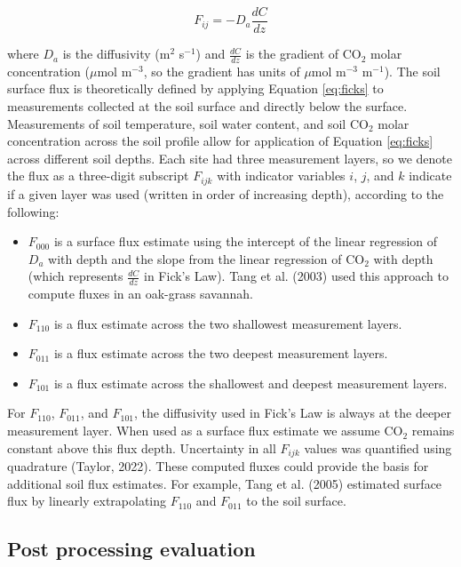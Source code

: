 \documentclass[
  letterpaper,
  DIV=11,
  numbers=noendperiod]{scrartcl}
\providecommand{\tightlist}{%
  \setlength{\itemsep}{0pt}\setlength{\parskip}{0pt}}\usepackage{longtable,booktabs,array}
\begin{document}
\begin{equation}
  F_{ij} = -D_{a} \frac{dC}{dz}
  \label{eq:ficks}
\end{equation}

where \(D_{a}\) is the diffusivity (m\(^{2}\) s\(^{-1}\)) and
\(\frac{dC}{dz}\) is the gradient of CO\(_{2}\) molar concentration
(\(\mu\)mol m\(^{-3}\), so the gradient has units of \(\mu\)mol
m\(^{-3}\) m\(^{-1}\)). The soil surface flux is theoretically defined
by applying Equation \ref{eq:ficks} to measurements collected at the
soil surface and directly below the surface. Measurements of soil
temperature, soil water content, and soil CO\(_{2}\) molar concentration
across the soil profile allow for application of Equation \ref{eq:ficks}
across different soil depths. Each site had three measurement layers, so
we denote the flux as a three-digit subscript \(F_{ijk}\) with indicator
variables \(i\), \(j\), and \(k\) indicate if a given layer was used
(written in order of increasing depth), according to the following:

\begin{itemize}
\tightlist
\item
  \(F_{000}\) is a surface flux estimate using the intercept of the
  linear regression of \(D_{a}\) with depth and the slope from the
  linear regression of CO\(_{2}\) with depth (which represents
  \(\displaystyle \frac{dC}{dz}\) in Fick's Law). Tang et al. (2003)
  used this approach to compute fluxes in an oak-grass savannah.
\item
  \(F_{110}\) is a flux estimate across the two shallowest measurement
  layers.
\item
  \(F_{011}\) is a flux estimate across the two deepest measurement
  layers.
\item
  \(F_{101}\) is a flux estimate across the shallowest and deepest
  measurement layers.
\end{itemize}

For \(F_{110}\), \(F_{011}\), and \(F_{101}\), the diffusivity used in
Fick's Law is always at the deeper measurement layer. When used as a
surface flux estimate we assume CO\(_{2}\) remains constant above this
flux depth. Uncertainty in all \(F_{ijk}\) values was quantified using
quadrature (Taylor, 2022). These computed fluxes could provide the basis
for additional soil flux estimates. For example, Tang et al. (2005)
estimated surface flux by linearly extrapolating \(F_{110}\) and
\(F_{011}\) to the soil surface.

\subsection{Post processing evaluation}\label{sec-post-process}
\end{document}
